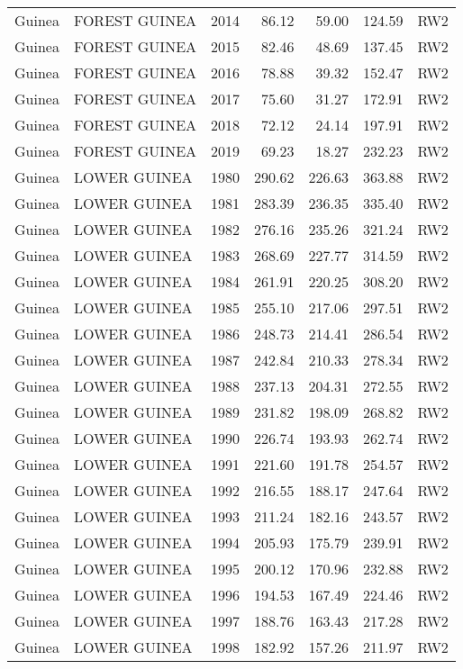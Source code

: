 \begin{longtable}{lllrrrl}
  Guinea & FOREST GUINEA & 2014 & 86.12 & 59.00 & 124.59 & RW2 \\ 
  Guinea & FOREST GUINEA & 2015 & 82.46 & 48.69 & 137.45 & RW2 \\ 
  Guinea & FOREST GUINEA & 2016 & 78.88 & 39.32 & 152.47 & RW2 \\ 
  Guinea & FOREST GUINEA & 2017 & 75.60 & 31.27 & 172.91 & RW2 \\ 
  Guinea & FOREST GUINEA & 2018 & 72.12 & 24.14 & 197.91 & RW2 \\ 
  Guinea & FOREST GUINEA & 2019 & 69.23 & 18.27 & 232.23 & RW2 \\ 
  Guinea & LOWER GUINEA & 1980 & 290.62 & 226.63 & 363.88 & RW2 \\ 
  Guinea & LOWER GUINEA & 1981 & 283.39 & 236.35 & 335.40 & RW2 \\ 
  Guinea & LOWER GUINEA & 1982 & 276.16 & 235.26 & 321.24 & RW2 \\ 
  Guinea & LOWER GUINEA & 1983 & 268.69 & 227.77 & 314.59 & RW2 \\ 
  Guinea & LOWER GUINEA & 1984 & 261.91 & 220.25 & 308.20 & RW2 \\ 
  Guinea & LOWER GUINEA & 1985 & 255.10 & 217.06 & 297.51 & RW2 \\ 
  Guinea & LOWER GUINEA & 1986 & 248.73 & 214.41 & 286.54 & RW2 \\ 
  Guinea & LOWER GUINEA & 1987 & 242.84 & 210.33 & 278.34 & RW2 \\ 
  Guinea & LOWER GUINEA & 1988 & 237.13 & 204.31 & 272.55 & RW2 \\ 
  Guinea & LOWER GUINEA & 1989 & 231.82 & 198.09 & 268.82 & RW2 \\ 
  Guinea & LOWER GUINEA & 1990 & 226.74 & 193.93 & 262.74 & RW2 \\ 
  Guinea & LOWER GUINEA & 1991 & 221.60 & 191.78 & 254.57 & RW2 \\ 
  Guinea & LOWER GUINEA & 1992 & 216.55 & 188.17 & 247.64 & RW2 \\ 
  Guinea & LOWER GUINEA & 1993 & 211.24 & 182.16 & 243.57 & RW2 \\ 
  Guinea & LOWER GUINEA & 1994 & 205.93 & 175.79 & 239.91 & RW2 \\ 
  Guinea & LOWER GUINEA & 1995 & 200.12 & 170.96 & 232.88 & RW2 \\ 
  Guinea & LOWER GUINEA & 1996 & 194.53 & 167.49 & 224.46 & RW2 \\ 
  Guinea & LOWER GUINEA & 1997 & 188.76 & 163.43 & 217.28 & RW2 \\ 
  Guinea & LOWER GUINEA & 1998 & 182.92 & 157.26 & 211.97 & RW2 \\ 

\end{longtable}
